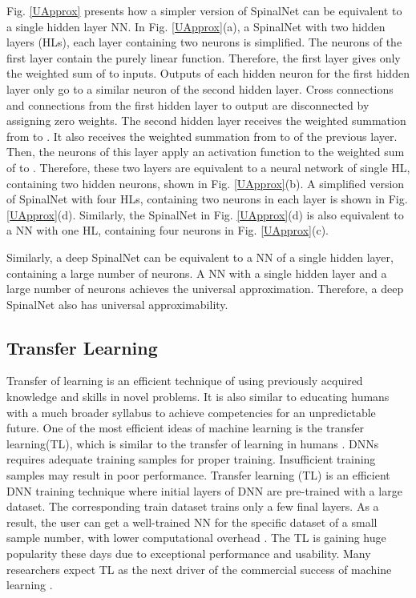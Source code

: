 \documentclass[journal]{IEEEtran}
\begin{document}
Fig. \ref{UApprox} presents how a simpler version of SpinalNet can be equivalent to a single hidden layer NN. In Fig. \ref{UApprox}(a), a SpinalNet with two hidden layers (HLs), each layer containing two neurons is simplified. The neurons of the first layer contain the purely linear function. Therefore, the first layer gives only the weighted sum of  to  inputs. Outputs of each hidden neuron for the first hidden layer only go to a similar neuron of the second hidden layer. Cross connections and connections from the first hidden layer to output are disconnected by assigning zero weights. The second hidden layer receives the weighted summation from  to . It also receives the weighted summation from   to  of the previous layer. Then, the neurons of this layer apply an activation function to the weighted sum of  to . Therefore, these two layers are equivalent to a neural network of single HL, containing two hidden neurons, shown in Fig. \ref{UApprox}(b). A simplified version of SpinalNet with four HLs, containing two neurons in each layer is shown in Fig. \ref{UApprox}(d). Similarly, the SpinalNet in Fig. \ref{UApprox}(d) is also equivalent to a NN with one HL, containing four neurons in Fig. \ref{UApprox}(c). 

Similarly, a deep SpinalNet can be equivalent to a NN of a single hidden layer, containing a large number of neurons.  A NN with a single hidden layer and a large number of neurons achieves the universal approximation. Therefore, a deep SpinalNet also has universal approximability.

\subsection{Transfer Learning}
Transfer of learning is an efficient technique of using previously acquired knowledge and skills in novel problems. It is also similar to educating humans with a much broader syllabus to achieve competencies for an unpredictable future. One of the most efficient ideas of machine learning is the transfer learning(TL), which is similar to the transfer of learning in humans \cite{wolf2019transfertransfo}. DNNs requires adequate training samples for proper training. Insufficient training samples may result in poor performance. Transfer learning (TL) is an efficient DNN training technique where initial layers of DNN are pre-trained with a large dataset. The corresponding train dataset trains only a few final layers. As a result, the user can get a well-trained NN for the specific dataset of a small sample number, with lower computational overhead \cite{shao2018starcraft}.  The TL is gaining huge popularity these days due to exceptional performance and usability. Many researchers expect TL as the next driver of the commercial success of machine learning \cite{ng2016nuts}.
\end{document}
